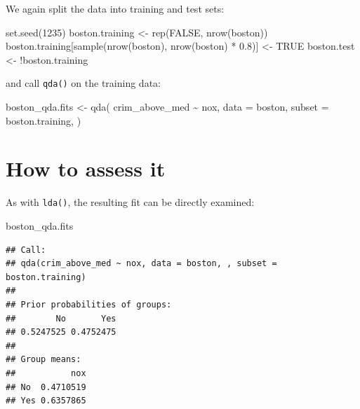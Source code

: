 \documentclass[
]{book}
\newenvironment{Shaded}{\begin{snugshade}}{\end{snugshade}}
\newcommand{\AttributeTok}[1]{\textcolor[rgb]{0.77,0.63,0.00}{#1}}
\newcommand{\ConstantTok}[1]{\textcolor[rgb]{0.00,0.00,0.00}{#1}}
\newcommand{\DecValTok}[1]{\textcolor[rgb]{0.00,0.00,0.81}{#1}}
\newcommand{\FloatTok}[1]{\textcolor[rgb]{0.00,0.00,0.81}{#1}}
\newcommand{\FunctionTok}[1]{\textcolor[rgb]{0.00,0.00,0.00}{#1}}
\newcommand{\NormalTok}[1]{#1}
\newcommand{\OtherTok}[1]{\textcolor[rgb]{0.56,0.35,0.01}{#1}}
\newcommand{\SpecialCharTok}[1]{\textcolor[rgb]{0.00,0.00,0.00}{#1}}
\begin{document}
We again split the data into training and test sets:

\begin{Shaded}
\begin{Highlighting}[]
\FunctionTok{set.seed}\NormalTok{(}\DecValTok{1235}\NormalTok{)}
\NormalTok{boston.training }\OtherTok{\textless{}{-}} \FunctionTok{rep}\NormalTok{(}\ConstantTok{FALSE}\NormalTok{, }\FunctionTok{nrow}\NormalTok{(boston))}
\NormalTok{boston.training[}\FunctionTok{sample}\NormalTok{(}\FunctionTok{nrow}\NormalTok{(boston), }\FunctionTok{nrow}\NormalTok{(boston) }\SpecialCharTok{*} \FloatTok{0.8}\NormalTok{)] }\OtherTok{\textless{}{-}} \ConstantTok{TRUE}
\NormalTok{boston.test }\OtherTok{\textless{}{-}} \SpecialCharTok{!}\NormalTok{boston.training}
\end{Highlighting}
\end{Shaded}

and call \texttt{qda()} on the training data:

\begin{Shaded}
\begin{Highlighting}[]
\NormalTok{boston\_qda.fits }\OtherTok{\textless{}{-}}
  \FunctionTok{qda}\NormalTok{(}
\NormalTok{    crim\_above\_med }\SpecialCharTok{\textasciitilde{}}\NormalTok{ nox,}
    \AttributeTok{data =}\NormalTok{ boston,}
    \AttributeTok{subset =}\NormalTok{ boston.training,}
\NormalTok{  )}
\end{Highlighting}
\end{Shaded}

\hypertarget{how-to-assess-it-4}{%
\section{How to assess it}\label{how-to-assess-it-4}}

As with \texttt{lda()}, the resulting fit can be directly examined:

\begin{Shaded}
\begin{Highlighting}[]
\NormalTok{boston\_qda.fits}
\end{Highlighting}
\end{Shaded}

\begin{verbatim}
## Call:
## qda(crim_above_med ~ nox, data = boston, , subset = boston.training)
## 
## Prior probabilities of groups:
##        No       Yes 
## 0.5247525 0.4752475 
## 
## Group means:
##           nox
## No  0.4710519
## Yes 0.6357865
\end{verbatim}
\end{document}
